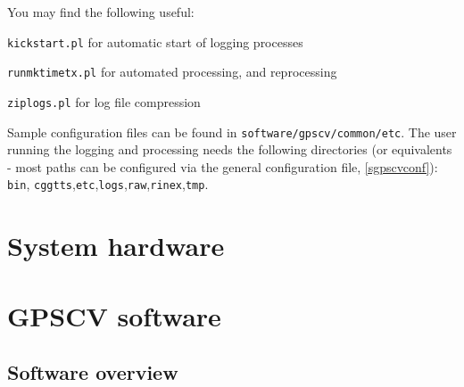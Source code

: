 \documentclass[11pt,a4paper,openany,oneside]{book}
\newcommand{\cc}[1]{{\texttt{#1}}}
\newenvironment{description*}%
  {\setlength{\parskip}{0pt}%
	 \begin{description}%
		\setlength{\topsep}{-12pt}%
		\setlength{\itemindent}{-12pt}%
    \setlength{\itemsep}{0pt}%
		\setlength{\itemsep}{0pt}}%
  {\end{description}}
\begin{document}
You may find the following useful:
\begin{description*}
	\item[] \cc{kickstart.pl} for automatic start of logging processes
	\item[] \cc{runmktimetx.pl} for automated processing, and reprocessing
	\item[] \cc{ziplogs.pl} for log file compression
\end{description*}	

Sample configuration files can be found in \cc{software/gpscv/common/etc}.
The user running the logging and processing needs the following directories (or equivalents - most paths
can be configured via the general configuration file, \ref{sgpscvconf}):
\cc{bin}, \cc{cggtts},\cc{etc},\cc{logs},\cc{raw},\cc{rinex},\cc{tmp}.

\chapter{System hardware}




\chapter{GPSCV software}

\section{Software overview}
\end{document}
